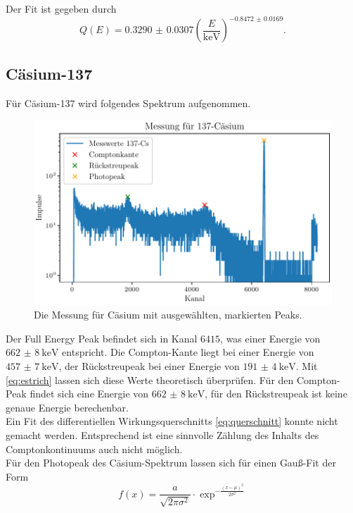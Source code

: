 Der Fit ist gegeben durch
\begin{equation}
    Q(E) = \num{0.3290(307)} (\frac{E}{\si{\kilo\electronvolt}})^{\num{-0.8472(169)}}.
    \label{eq:fiteffizienz}
\end{equation}

\subsection{Cäsium-137}

Für Cäsium-137 wird folgendes Spektrum aufgenommen.

\begin{figure}[H]
    \centering
    \includegraphics[width=\textwidth]{plots/Caesium.pdf}
    \caption{Die Messung für Cäsium mit ausgewählten, markierten Peaks.}
    \label{fig:Cäsium}
\end{figure}

Der Full Energy Peak befindet sich in Kanal $6415$, was einer Energie von $\qty{662(8)}{\kilo\electronvolt}$ entspricht.
Die Compton-Kante liegt bei einer Energie von $\qty{457(7)}{\kilo\electronvolt}$, der Rückstreupeak bei einer Energie von $\qty{191(4)}{\kilo\electronvolt}$.
Mit \eqref{eq:estrich} lassen sich diese Werte theoretisch überprüfen. Für den Compton-Peak findet sich eine Energie von $\qty{662(8)}{\kilo\electronvolt}$, für den Rückstreupeak ist keine genaue Energie berechenbar. \\

Ein Fit des differentiellen Wirkungsquerschnitts \eqref{eq:querschnitt} konnte nicht gemacht werden. Entsprechend ist eine sinnvolle Zählung des Inhalts des Comptonkontinuums auch nicht möglich. \\

Für den Photopeak des Cäsium-Spektrum lassen sich für einen Gauß-Fit der Form
\begin{equation}
    f(x) = \frac{a}{\sqrt{2\pi \sigma^2}} \cdot \exp^{-\frac{(x-\mu)^2}{2\sigma^2}}
    \label{eq:gauß}
\end{equation}

